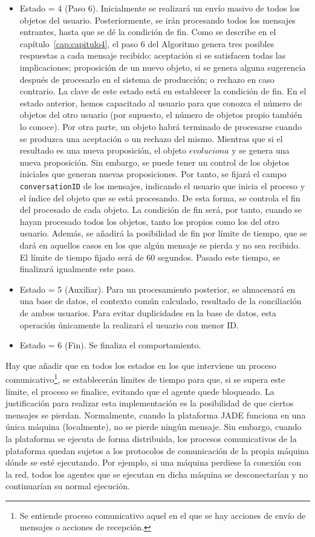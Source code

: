 \begin{itemize}
	\item Estado = 4 (Paso 6). Inicialmente se realizará un envío masivo de todos los objetos del usuario. Posteriormente, se irán procesando todos los mensajes entrantes, hasta que se dé la condición de fin. Como se describe en el capítulo~\ref{cap:capitulo4}, el paso 6 del Algoritmo genera tres posibles respuestas a cada mensaje recibido: aceptación si se satisfacen todas las implicaciones; proposición de un nuevo objeto, si se genera alguna sugerencia después de procesarlo en el sistema de producción; o rechazo en caso contrario. La clave de este estado está en establecer la condición de fin. En el estado anterior, hemos capacitado al usuario para que conozca el número de objetos del otro usuario (por supuesto, el número de objetos propio también lo conoce). Por otra parte, un objeto habrá terminado de procesarse cuando se produzca una aceptación o un rechazo del mismo. Mientras que si el resultado es una nueva proposición, el objeto $evoluciona$ y se genera una nueva proposición. Sin embargo, se puede tener un control de los objetos iniciales que generan nuevas proposiciones. Por tanto, se fijará el campo {\tt conversationID} de los mensajes, indicando el usuario que inicia el proceso y el índice del objeto que se está procesando. De esta forma, se controla el fin del procesado de cada objeto. La condición de fin será, por tanto, cuando se hayan procesado todos los objetos, tanto los propios como los del otro usuario. Además, se añadirá la posibilidad de fin por límite de tiempo, que se dará en aquellos casos en los que algún mensaje se pierda y no sea recibido. El límite de tiempo fijado será de 60 segundos. Pasado este tiempo, se finalizará igualmente este paso.
	\item  Estado = 5 (Auxiliar). Para un procesamiento posterior, se almacenará en una base de datos, el contexto común calculado, resultado de la conciliación de ambos usuarios. Para evitar duplicidades en la base de datos, esta operación únicamente la realizará el usuario con menor ID.
	\item Estado = 6 (Fin). Se finaliza el comportamiento.
\end{itemize}

Hay que añadir que en todos los estados en los que interviene un proceso comunicativo\footnote{Se entiende proceso comunicativo aquel en el que se hay acciones de envío de mensajes o acciones de recepción.}, se establecerán límites de tiempo para que, si se supera este límite, el proceso se finalice, evitando que el agente quede bloqueado. La justificación para realizar esta implementación es la posibilidad de que ciertos mensajes se pierdan. Normalmente, cuando la plataforma JADE funciona en una única máquina (localmente), no se pierde ningún mensaje. Sin embargo, cuando la plataforma se ejecuta de forma distribuida, los procesos comunicativos de la plataforma quedan sujetos a los protocolos de comunicación de la propia máquina dónde se esté ejecutando. Por ejemplo, si una máquina perdiese la conexión con la red, todos los agentes que se ejecutan en dicha máquina se desconectarían y no continuarían su normal ejecución.


